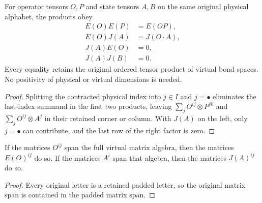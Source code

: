\begin{lemma}
    \leanok
    \label{thm:glm_triangular_padding_products}
    For operator tensors $O,P$ and state tensors $A,B$ on the same original
    physical alphabet, the products obey
    \begin{align}
        E(O)E(P) & =E(OP),
        \label{eq:glm_padding_operator_product} \\
        E(O)J(A) & =J(O\cdot A),
        \label{eq:glm_padding_action_product}   \\
        J(A)E(O) & =0,
        \label{eq:glm_padding_state_operator}   \\
        J(A)J(B) & =0.
        \label{eq:glm_padding_state_state}
    \end{align}
    Every equality retains the original ordered tensor product of virtual
    bond spaces. No positivity of physical or virtual dimensions is needed.
\end{lemma}
\begin{proof}
    \leanok
    Splitting the contracted physical index into $j\in I$ and $j=\bullet$
    eliminates the last-index summand in the first two products, leaving
    $\sum_j O^{ij}\otimes P^{jk}$ and $\sum_j O^{ij}\otimes A^j$ in their
    retained corner or column. With $J(A)$ on the left, only $j=\bullet$
    can contribute, and the last row of the right factor is zero.
\end{proof}

\begin{lemma}
    \leanok
    \label{thm:glm_triangular_padding_injectivity}
    If the matrices $O^{ij}$ span the full virtual matrix algebra, then
    the matrices $E(O)^{ij}$ do so. If the matrices $A^i$ span that algebra,
    then the matrices $J(A)^{ij}$ do so.
\end{lemma}
\begin{proof}
    \leanok
    Every original letter is a retained padded letter, so the original
    matrix span is contained in the padded matrix span.
\end{proof}

